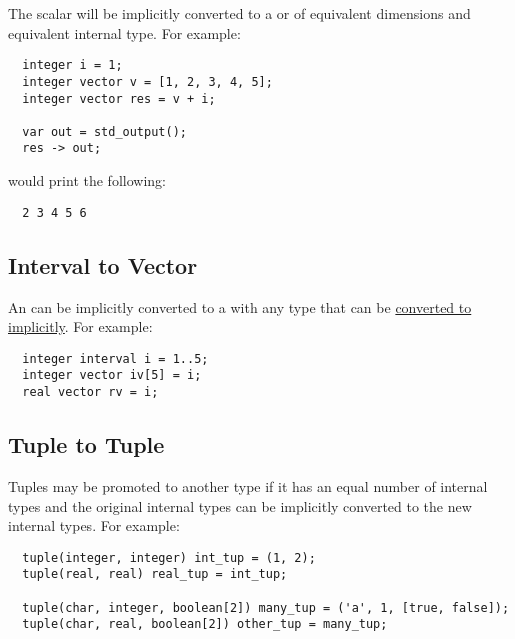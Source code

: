 \documentclass[../gazprea.tex]{subfiles}
\begin{document}
The scalar will be implicitly converted to a  or  of equivalent dimensions
and equivalent internal type. For example:
\begin{lstlisting}
  integer i = 1;
  integer vector v = [1, 2, 3, 4, 5];
  integer vector res = v + i;

  var out = std_output();
  res -> out;
\end{lstlisting}

would print the following:
\begin{lstlisting}
  2 3 4 5 6
\end{lstlisting}

\subsection{Interval to Vector}
\label{ssec:typePromotion_ivltov}
An  can be implicitly converted to a  with any type that 
can be \hyperref[ssec:typePromotion_scalar]{converted to implicitly}. For example:
\begin{lstlisting}
  integer interval i = 1..5;
  integer vector iv[5] = i;
  real vector rv = i;
\end{lstlisting}

\subsection{Tuple to Tuple}
\label{ssec:typePromotion_ttot}
Tuples may be promoted to another type if it has an equal number of internal types and the original
internal types can be implicitly converted to the new internal types. For example:
\begin{lstlisting}
  tuple(integer, integer) int_tup = (1, 2);
  tuple(real, real) real_tup = int_tup;

  tuple(char, integer, boolean[2]) many_tup = ('a', 1, [true, false]);
  tuple(char, real, boolean[2]) other_tup = many_tup;
\end{lstlisting}
\end{document}
